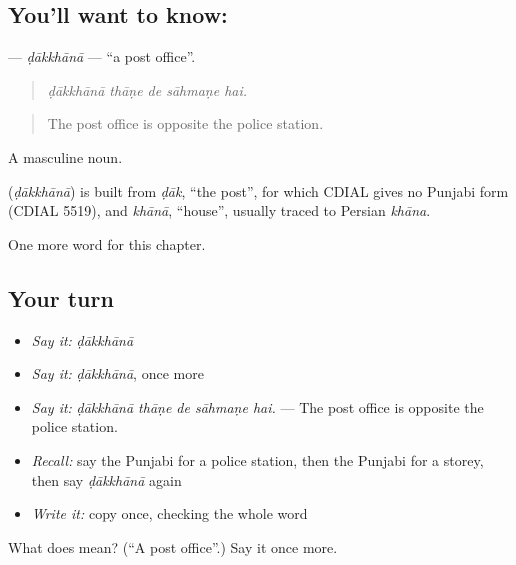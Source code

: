 \subsection*{You'll want to know: }
\textbf{} — \emph{ḍākkhānā} — \textquotedblleft{}a post office\textquotedblright{}.

\begin{quote}
    
\end{quote}

\begin{quote}
\emph{ḍākkhānā thāṇe de sāhmaṇe hai.}
\end{quote}

\begin{quote}
The post office is opposite the police station.
\end{quote}

A masculine noun.

\begin{cousinweb}
\textbf{} (\emph{ḍākkhānā}) is built from \emph{ḍāk}, \textquotedblleft{}the post\textquotedblright{}, for which CDIAL gives no Punjabi form (CDIAL 5519), and \emph{khānā}, \textquotedblleft{}house\textquotedblright{}, usually traced to Persian \emph{khāna}.
\end{cousinweb}

\begin{grammarlens}[title={What you've built}]
One more word for this chapter.
\end{grammarlens}

\subsection*{Your turn}
\begin{itemize}
\raggedright
  \item \emph{Say it:} \emph{ḍākkhānā}
  \item \emph{Say it:} \emph{ḍākkhānā}, once more
  \item \emph{Say it:} \emph{ḍākkhānā thāṇe de sāhmaṇe hai.} — The post office is opposite the police station.
  \item \emph{Recall:} say the Punjabi for a police station, then the Punjabi for a storey, then say \emph{ḍākkhānā} again
  \item \emph{Write it:} copy \textbf{} once, checking the whole word
\end{itemize}

\begin{tcolorbox}[breakable,colback=teal!4,colframe=teal!35!black,title={Before you move on}]
What does  mean? (\textquotedblleft{}A post office\textquotedblright{}.) Say it once more.
\end{tcolorbox}
